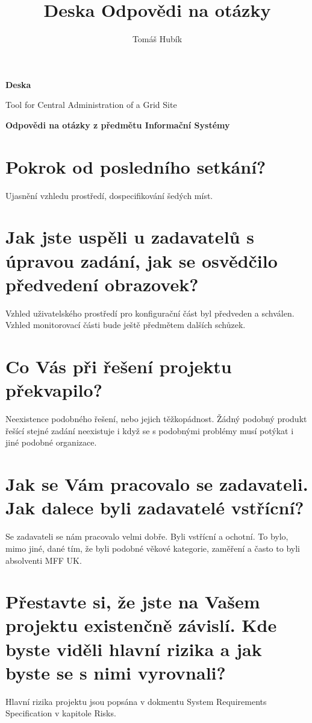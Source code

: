 \documentclass[12pt]{article}
\author{Tomáš Hubík}
\title{Deska Odpovědi na otázky}
\begin{document}
{\Huge \textbf{Deska}}

\vspace{0.2in}

{\large Tool for Central Administration of a Grid Site}

\vspace{0.5in}

{\Large \textbf{Odpovědi na otázky z předmětu Informační Systémy}}

\vspace{0.5in}


\section{Pokrok od posledního setkání?}
Ujasnění vzhledu prostředí, dospecifikování šedých míst.

\section{Jak jste uspěli u zadavatelů s úpravou zadání, jak se osvědčilo
předvedení obrazovek?}
Vzhled uživatelského prostředí pro konfigurační část byl předveden a schválen.
Vzhled monitorovací části bude ještě předmětem dalších schůzek.

\section{Co Vás při řešení projektu překvapilo?}
Neexistence podobného řešení, nebo jejich těžkopádnost. Žádný podobný produkt
řešící stejné zadání neexistuje i když se s podobnými problémy musí potýkat i
jiné podobné organizace.

\section{Jak se Vám pracovalo se zadavateli. Jak dalece byli zadavatelé
vstřícní?}
Se zadavateli se nám pracovalo velmi dobře. Byli vstřícní a ochotní. To bylo,
mimo jiné, dané tím, že byli podobné věkové kategorie, zaměření a často to byli
absolventi MFF UK. 

\section{ Přestavte si, že jste na Vašem projektu existenčně závislí. Kde byste
viděli hlavní rizika a jak byste se s nimi vyrovnali?}
Hlavní rizika projektu jsou popsána v dokmentu System Requirements Specification
v kapitole Risks.
\end{document}
